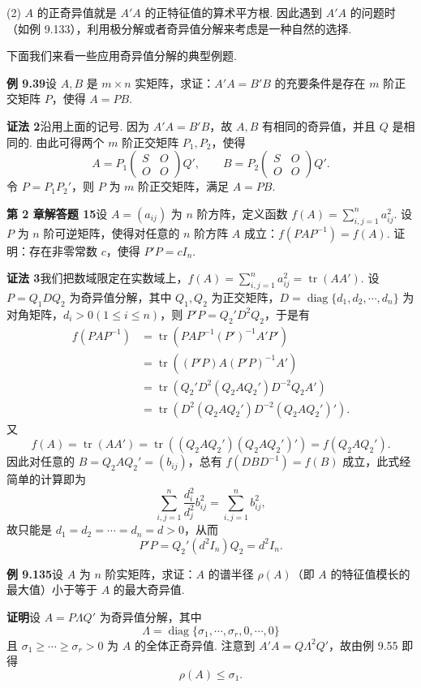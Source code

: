 \documentclass[UTF8,12pt,a4paper,fontset=fandol]{ctexart}
\begin{document}
(2) $A$ 的正奇异值就是 $A'A$ 的正特征值的算术平方根. 因此遇到 $A'A$ 的问题时（如例 9.133），利用极分解或者奇异值分解来考虑是一种自然的选择.

下面我们来看一些应用奇异值分解的典型例题.

\noindent\textbf{例 9.39}\quad 设 $A,B$ 是 $m\times n$ 实矩阵，求证：$A'A=B'B$ 的充要条件是存在 $m$ 阶正交矩阵 $P$，使得 $A=PB$.

\noindent\textbf{证法 2}\quad 沿用上面的记号. 因为 $A'A=B'B$，故 $A,B$ 有相同的奇异值，并且 $Q$ 是相同的. 由此可得两个 $m$ 阶正交矩阵 $P_1,P_2$，使得
\[
A=P_1\begin{pmatrix}
S&O\\
O&O
\end{pmatrix}Q',\qquad
B=P_2\begin{pmatrix}
S&O\\
O&O
\end{pmatrix}Q'.
\]
令 $P=P_1P_2'$，则 $P$ 为 $m$ 阶正交矩阵，满足 $A=PB$.

\noindent\textbf{第 2 章解答题 15}\quad 设 $A=(a_{ij})$ 为 $n$ 阶方阵，定义函数 $f(A)=\sum_{i,j=1}^n a_{ij}^2$. 设 $P$ 为 $n$ 阶可逆矩阵，使得对任意的 $n$ 阶方阵 $A$ 成立：$f(PAP^{-1})=f(A)$. 证明：存在非零常数 $c$，使得 $P'P=cI_n$.

\noindent\textbf{证法 3}\quad 我们把数域限定在实数域上，$f(A)=\sum_{i,j=1}^n a_{ij}^2=\operatorname{tr}(AA')$. 设 $P=Q_1DQ_2$ 为奇异值分解，其中 $Q_1,Q_2$ 为正交矩阵，$D=\operatorname{diag}\{d_1,d_2,\cdots,d_n\}$ 为对角矩阵，$d_i>0(1\le i\le n)$，则 $P'P=Q_2'D^2Q_2$，于是有
\[
\begin{aligned}
f(PAP^{-1})
&=\operatorname{tr}(PAP^{-1}(P')^{-1}A'P')\\
&=\operatorname{tr}((P'P)A(P'P)^{-1}A')\\
&=\operatorname{tr}(Q_2'D^2(Q_2AQ_2')D^{-2}Q_2A')\\
&=\operatorname{tr}(D^2(Q_2AQ_2')D^{-2}(Q_2AQ_2')').
\end{aligned}
\]
又
\[
f(A)=\operatorname{tr}(AA')=\operatorname{tr}((Q_2AQ_2')(Q_2AQ_2')')=f(Q_2AQ_2').
\]
因此对任意的 $B=Q_2AQ_2'=(b_{ij})$，总有 $f(DBD^{-1})=f(B)$ 成立，此式经简单的计算即为
\[
\sum_{i,j=1}^n\frac{d_i^2}{d_j^2}b_{ij}^2=\sum_{i,j=1}^n b_{ij}^2,
\]
故只能是 $d_1=d_2=\cdots=d_n=d>0$，从而
\[
P'P=Q_2'(d^2I_n)Q_2=d^2I_n.
\]

\noindent\textbf{例 9.135}\quad 设 $A$ 为 $n$ 阶实矩阵，求证：$A$ 的谱半径 $\rho(A)$（即 $A$ 的特征值模长的最大值）小于等于 $A$ 的最大奇异值.

\noindent\textbf{证明}\quad 设 $A=P\Lambda Q'$ 为奇异值分解，其中
\[
\Lambda=\operatorname{diag}\{\sigma_1,\cdots,\sigma_r,0,\cdots,0\}
\]
且 $\sigma_1\ge\cdots\ge\sigma_r>0$ 为 $A$ 的全体正奇异值. 注意到 $A'A=Q\Lambda^2Q'$，故由例 9.55 即得
\[
\rho(A)\le\sigma_1.
\]
\end{document}

